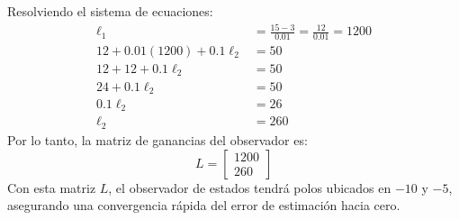 \documentclass[
  11pt,
  letterpaper,
   addpoints,
  answers
  ]{exam}
\begin{document}
\begin{solution}
Resolviendo el sistema de ecuaciones:
\begin{align}
  \ell_1 &= \frac{15-3}{0.01} = \frac{12}{0.01} = 1200 \\
  12 + 0.01(1200) + 0.1\ell_2 &= 50 \\
  12 + 12 + 0.1\ell_2 &= 50 \\
  24 + 0.1\ell_2 &= 50 \\
  0.1\ell_2 &= 26 \\
  \ell_2 &= 260
\end{align}
Por lo tanto, la matriz de ganancias del observador es:
\[
L=\begin{bmatrix}1200\\260\end{bmatrix}
\]
Con esta matriz $L$, el observador de estados tendrá polos ubicados en $-10$ y $-5$, asegurando una convergencia rápida del error de estimación hacia cero.
\end{solution}
\end{document}
